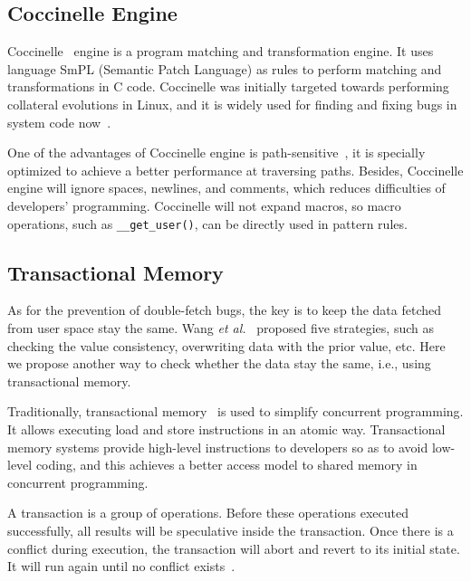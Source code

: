 \documentclass[10pt]{llncs}
\begin{document}
\subsection{Coccinelle Engine}
\label{back2}

Coccinelle~\cite{Jones2007The,Stuart2008Hunting} engine is a program matching and transformation engine. It uses language SmPL (Semantic Patch Language) as rules to perform matching and transformations in C code. Coccinelle was initially targeted towards performing collateral evolutions in Linux, and it is widely used for finding and fixing bugs in system code now~\cite{lawall2010finding}.

One of the advantages of Coccinelle engine is path-sensitive~\cite{Jones2007The}, it is specially optimized to achieve a better performance at traversing paths. Besides, Coccinelle engine will ignore spaces, newlines, and comments, which reduces difficulties of developers' programming. Coccinelle will not expand macros, so macro operations, such as \verb:__get_user():, can be directly used in pattern rules.

\subsection{Transactional Memory}
\label{back3}
As for the prevention of double-fetch bugs, the key is to keep the data fetched from user space stay the same. Wang \textit{et al.}~\cite{wang} proposed five strategies, such as checking the value consistency, overwriting data with the prior value, etc. Here we propose another way to check whether the data stay the same, i.e., using transactional memory.

Traditionally, transactional memory~\cite{Herlihy1993Transactional,Harris2010Transactional,Hammond2004Transactional} is used to simplify concurrent programming. It allows executing load and store instructions in an atomic way. Transactional memory systems provide high-level instructions to developers so as to avoid low-level coding, and this achieves a better access model to shared memory in concurrent programming.

A transaction is a group of operations. Before these operations executed successfully, all results will be speculative inside the transaction. Once there is a conflict during execution, the transaction will abort and revert to its initial state. It will run again until no conflict exists~\cite{Harris2010Transactional}. 
\end{document}
